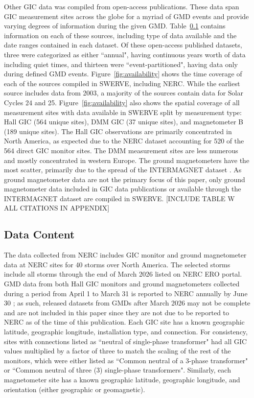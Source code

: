 \documentclass[draft]{agujournal2019}
\begin{document}
Other GIC data was compiled from open-access publications. These data span GIC measurement sites across the globe for a myriad of GMD events and provide varying degrees of information during the given GMD. 
Table~\ref{} contains information on each of these sources, including type of data available and the date ranges contained in each dataset.
Of these open-access published datasets, three were categorized as either ``annual", having continuous years worth of data including quiet times, and thirteen were ``event-partitioned", having data only during defined GMD events. 
Figure~\ref{fig:availability} shows the time coverage of each of the sources compiled in SWERVE, including NERC. While the earliest source includes data from 2003, a majority of the sources contain data for Solar Cycles 24 and 25. 
Figure~\ref{fig:availability} also shows the spatial coverage of all measurement sites with data available in SWERVE split by measurement type: Hall GIC (564 unique sites), DMM GIC (37 unique sites), and magnetometer B (189 unique sites). The Hall GIC observations are primarily concentrated in North America, as expected due to the NERC dataset accounting for 520 of the 564 direct GIC monitor sites. The DMM measurement sites are less numerous and mostly concentrated in western Europe. The ground magnetometers have the most scatter, primarily due to the spread of the INTERMAGNET dataset \cite{}. 
As ground magnetometer data are not the primary focus of this paper, only ground magnetometer data included in GIC data publications or available through the INTERMAGNET dataset are compiled in SWERVE.
[INCLUDE TABLE W ALL CITATIONS IN APPENDIX]

\subsection{Data Content}
The data collected from NERC includes GIC monitor and ground magnetometer data at NERC sites for 40 storms over North America. The selected storms include all storms through the end of March 2026 listed on NERC ERO portal. 
GMD data from both Hall GIC monitors and ground magnetometers collected during a period from April 1 to March 31 is reported to NERC annually by June 30 \cite{NERC2026_reporting}; as such, released datasets from GMDs after March 2026 may not be complete and are not included in this paper since they are not due to be reported to NERC as of the time of this publication.
Each GIC site has a known geographic latitude, geographic longitude, installation type, and connection. For consistency, sites with connections listed as ``neutral of single-phase transformer" had all GIC values multiplied by a factor of three to match the scaling of the rest of the monitors, which were either listed as ``Common neutral of a 3-phase transformer" or ``Common neutral of three (3) single-phase transformers".
Similarly, each magnetometer site has a known geographic latitude, geographic longitude, and orientation (either geographic or geomagnetic).
\end{document}

